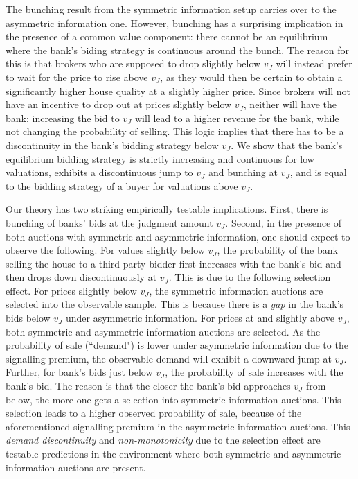 \documentclass[11pt,twopage]{article}
\begin{document}
The bunching result from the symmetric information setup carries over to the asymmetric information one. However, bunching has a surprising implication in the presence of a common value component: there cannot be an equilibrium where the bank's biding strategy is continuous around the bunch. The reason for this is that brokers who are supposed to drop slightly below $v_J$ will instead prefer to wait for the price to rise above $v_J$, as they would then be certain to obtain a significantly higher house quality at a slightly higher price. Since brokers will not have an incentive to drop out at prices slightly below $v_J$, neither will have the bank: increasing the bid to $v_J$ will lead to a higher revenue for the bank, while not changing the probability of selling. This logic implies that there has to be a discontinuity in the bank's bidding strategy below $v_J$. We show that the bank's equilibrium bidding strategy is strictly increasing and continuous for low valuations, exhibits a discontinuous jump to $v_J$ and bunching at $v_J$, and is equal to the bidding strategy of a buyer for valuations above $v_J$.


Our
theory has two striking empirically testable implications. First,
there is bunching of banks' bids at the judgment amount $v_J$. Second, in the presence of both auctions with symmetric and asymmetric information, one should expect to observe the
following. For values slightly below $v_J$, the probability of the bank selling the house to a third-party bidder first increases with the bank's bid and then drops down discontinuously at $v_J$. This is due to the following selection effect. For prices slightly below $v_J$, the symmetric information auctions are selected into the observable sample. This is because there is a \emph{gap} in the bank's bids below $v_J$ under asymmetric information. For prices at and slightly above $v_J$, both symmetric and asymmetric information auctions are selected. As the probability of sale (``demand") is lower under asymmetric information due to the signalling premium, the observable demand will exhibit a downward jump at $v_J$. Further, for bank's bids just below $v_J$, the probability of sale increases with the bank's bid. The reason is that the closer the bank's bid approaches $v_J$ from below, the more one gets a selection into symmetric information auctions. This selection leads to a higher observed probability of sale, because of the aforementioned signalling premium in the asymmetric information auctions. This \emph{demand discontinuity} and \emph{non-monotonicity} due to the selection effect are testable predictions in the environment where both symmetric and asymmetric information auctions are present.
\end{document}
